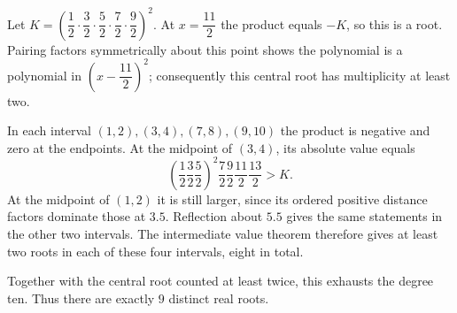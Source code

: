 Let $K=\left(\dfrac{1}{2}\cdot\dfrac{3}{2}\cdot\dfrac{5}{2}\cdot\dfrac{7}{2}\cdot\dfrac{9}{2}\right)^2$. At $x=\dfrac{11}{2}$ the product equals $-K$, so this is a root. Pairing factors symmetrically about this point shows the polynomial is a polynomial in $\left(x-\dfrac{11}{2}\right)^2$; consequently this central root has multiplicity at least two.

In each interval $(1,2),(3,4),(7,8),(9,10)$ the product is negative and zero at the endpoints. At the midpoint of $(3,4)$, its absolute value equals
\[
\left(\dfrac{1}{2}\dfrac{3}{2}\dfrac{5}{2}\right)^2
\dfrac{7}{2}\dfrac{9}{2}\dfrac{11}{2}\dfrac{13}{2}>K.
\]
At the midpoint of $(1,2)$ it is still larger, since its ordered positive distance factors dominate those at $3.5$. Reflection about $5.5$ gives the same statements in the other two intervals. The intermediate value theorem therefore gives at least two roots in each of these four intervals, eight in total.

Together with the central root counted at least twice, this exhausts the degree ten. Thus there are exactly $\boxed9$ distinct real roots.
